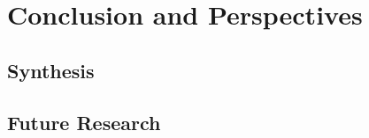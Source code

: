 \chapter{Conclusion and Perspectives \label{chap:ccl}}
\section{Synthesis}
\section{Future Research}
